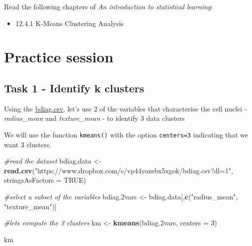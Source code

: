 \documentclass[
]{book}
\newenvironment{Shaded}{\begin{snugshade}}{\end{snugshade}}
\newcommand{\AttributeTok}[1]{\textcolor[rgb]{0.13,0.29,0.53}{#1}}
\newcommand{\CommentTok}[1]{\textcolor[rgb]{0.56,0.35,0.01}{\textit{#1}}}
\newcommand{\ConstantTok}[1]{\textcolor[rgb]{0.56,0.35,0.01}{#1}}
\newcommand{\DecValTok}[1]{\textcolor[rgb]{0.00,0.00,0.81}{#1}}
\newcommand{\FloatTok}[1]{\textcolor[rgb]{0.00,0.00,0.81}{#1}}
\newcommand{\FunctionTok}[1]{\textcolor[rgb]{0.13,0.29,0.53}{\textbf{#1}}}
\newcommand{\NormalTok}[1]{#1}
\newcommand{\OtherTok}[1]{\textcolor[rgb]{0.56,0.35,0.01}{#1}}
\newcommand{\StringTok}[1]{\textcolor[rgb]{0.31,0.60,0.02}{#1}}
\providecommand{\tightlist}{%
  \setlength{\itemsep}{0pt}\setlength{\parskip}{0pt}}
\begin{document}
Read the following chapters of \emph{An introduction to statistical learning}:

\begin{itemize}
\tightlist
\item
  12.4.1 K-Means Clustering Analysis
\end{itemize}

\section{Practice session}\label{KM3}

\subsection*{Task 1 - Identify k clusters}\label{task-1---identify-k-clusters}

Using the \href{https://www.dropbox.com/s/vp44yozebx5xgok/bdiag.csv?dl=1}{bdiag.csv},
let's use 2 of the variables that characterise the cell nuclei - \emph{radius\_mean}
and \emph{texture\_mean} - to identify 3 data clusters

We will use the function \texttt{kmeans()} with the option \texttt{centers=3} indicating
that we want 3 clusters.

\begin{Shaded}
\begin{Highlighting}[]
\CommentTok{\#read the dataset}
\NormalTok{bdiag.data }\OtherTok{\textless{}{-}} \FunctionTok{read.csv}\NormalTok{(}\StringTok{"https://www.dropbox.com/s/vp44yozebx5xgok/bdiag.csv?dl=1"}\NormalTok{, }
           \AttributeTok{stringsAsFactors =} \ConstantTok{TRUE}\NormalTok{)}

\CommentTok{\#select a subset of the variables}
\NormalTok{bdiag}\FloatTok{.2}\NormalTok{vars }\OtherTok{\textless{}{-}}\NormalTok{ bdiag.data[,}\FunctionTok{c}\NormalTok{(}\StringTok{"radius\_mean"}\NormalTok{, }\StringTok{"texture\_mean"}\NormalTok{)]}

\CommentTok{\#let\textquotesingle{}s compute the 3 clusters}
\NormalTok{km }\OtherTok{\textless{}{-}} \FunctionTok{kmeans}\NormalTok{(bdiag}\FloatTok{.2}\NormalTok{vars, }\AttributeTok{centers =} \DecValTok{3}\NormalTok{)}

\NormalTok{km}
\end{Highlighting}
\end{Shaded}
\end{document}
